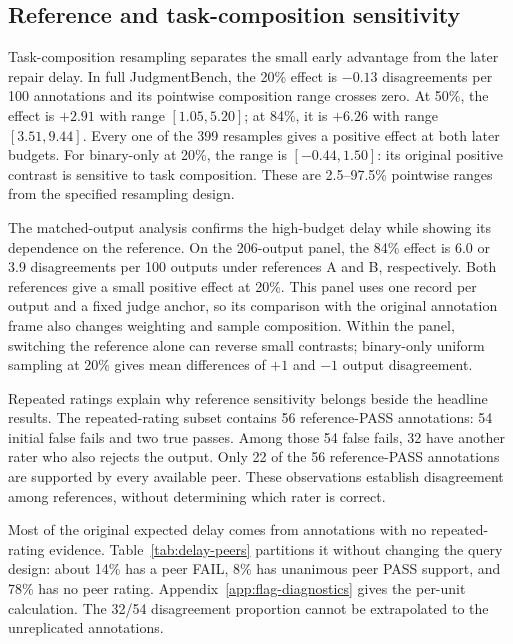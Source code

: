 \documentclass[10pt,letterpaper]{article}
\begin{document}
\subsection{Reference and task-composition sensitivity}
Task-composition resampling separates the small early advantage from the later repair delay. In full JudgmentBench, the 20\% effect is $-0.13$ disagreements per 100 annotations and its pointwise composition range crosses zero. At 50\%, the effect is $+2.91$ with range $[1.05,5.20]$; at 84\%, it is $+6.26$ with range $[3.51,9.44]$. Every one of the 399 resamples gives a positive effect at both later budgets. For binary-only at 20\%, the range is $[-0.44,1.50]$: its original positive contrast is sensitive to task composition. These are 2.5--97.5\% pointwise ranges from the specified resampling design.

The matched-output analysis confirms the high-budget delay while showing its dependence on the reference. On the 206-output panel, the 84\% effect is 6.0 or 3.9 disagreements per 100 outputs under references A and B, respectively. Both references give a small positive effect at 20\%. This panel uses one record per output and a fixed judge anchor, so its comparison with the original annotation frame also changes weighting and sample composition. Within the panel, switching the reference alone can reverse small contrasts; binary-only uniform sampling at 20\% gives mean differences of $+1$ and $-1$ output disagreement.

Repeated ratings explain why reference sensitivity belongs beside the headline results. The repeated-rating subset contains 56 reference-PASS annotations: 54 initial false fails and two true passes. Among those 54 false fails, 32 have another rater who also rejects the output. Only 22 of the 56 reference-PASS annotations are supported by every available peer. These observations establish disagreement among references, without determining which rater is correct.

Most of the original expected delay comes from annotations with no repeated-rating evidence. Table~\ref{tab:delay-peers} partitions it without changing the query design: about 14\% has a peer FAIL, 8\% has unanimous peer PASS support, and 78\% has no peer rating. Appendix~\ref{app:flag-diagnostics} gives the per-unit calculation. The 32/54 disagreement proportion cannot be extrapolated to the unreplicated annotations.
\end{document}
